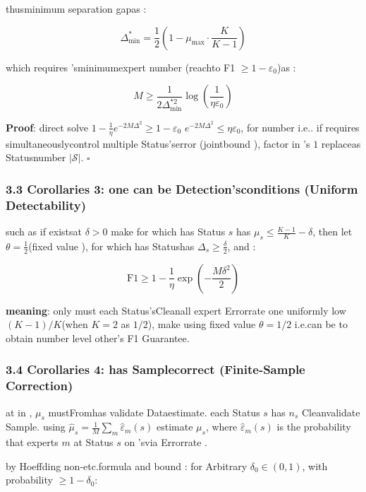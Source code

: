 \documentclass[
  12pt,
]{article}
\begin{document}
thusminimum separation gapas : 

\[\Delta_{\min}^* = \frac{1}{2}\left(1 - \mu_{\max} \cdot \frac{K}{K-1}\right)\]

which requires 'sminimumexpert number (reachto  F1 \(\geq 1 - \varepsilon_0\))as : 

\[M \geq \frac{1}{2\Delta_{\min}^{*2}} \log\left(\frac{1}{\eta \varepsilon_0}\right)\]

\textbf{Proof}: direct solve
\(1 - \frac{1}{\eta}e^{-2M\Delta^2} \geq 1 - \varepsilon_0\) 
\(e^{-2M\Delta^2} \leq \eta\varepsilon_0\), for number i.e.. if requires simultaneouslycontrol multiple Status'serror (jointbound ), factor in 's
\(1\) replaceas Statusnumber  \(|\mathcal{S}|\). \(\square\)

\subsubsection{3.3 Corollaries 3: one can be Detection'sconditions (Uniform
Detectability)}\label{ux63a8ux8bba-3ux4e00ux81f4ux53efux68c0ux6d4bux7684ux5145ux5206ux6761ux4ef6-uniform-detectability}

such as if existsat  \(\delta > 0\) make for which has Status \(s\) has 
\(\mu_s \leq \frac{K-1}{K} - \delta\), then let
\(\theta = \frac{1}{2}\)(fixed value ), for which has Statushas 
\(\Delta_s \geq \frac{\delta}{2}\), and : 

\[\text{F1} \geq 1 - \frac{1}{\eta} \exp\!\left(-\frac{M\delta^2}{2}\right)\]

\textbf{meaning}: only must each Status'sCleanall expert Errorrate one uniformly low \((K-1)/K\)(when 
\(K=2\) as  \(1/2\)), make using fixed value  \(\theta = 1/2\) i.e.can be to obtain number level other's
F1 Guarantee. 

\subsubsection{3.4 Corollaries 4: has Samplecorrect (Finite-Sample
Correction)}\label{ux63a8ux8bba-4ux6709ux9650ux6837ux672cux6821ux6b63-finite-sample-correction}

at in , \(\mu_s\) mustFromhas validate Dataestimate. each Status \(s\) has  \(n_s\)
Cleanvalidate Sample. using 
\(\hat{\mu}_s = \frac{1}{M}\sum_m \hat{\varepsilon}_m(s)\) estimate
\(\mu_s\), where \(\hat{\varepsilon}_m(s)\) is the probability that experts \(m\) at Status \(s\)
on 'svia Errorrate . 

by  Hoeffding non-etc.formula and bound : for Arbitrary \(\delta_0 \in (0, 1)\), with probability
\(\geq 1 - \delta_0\): 
\end{document}

